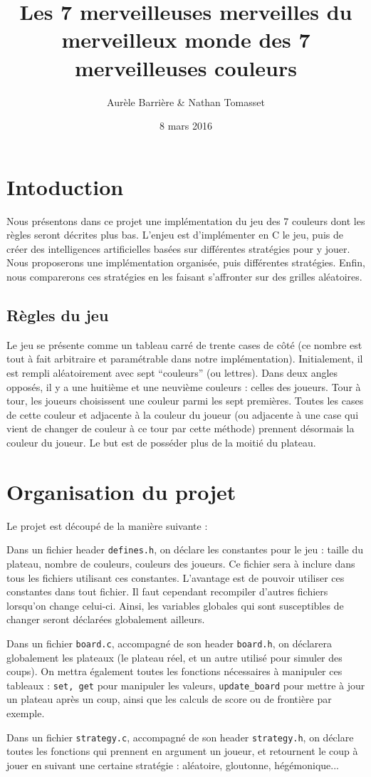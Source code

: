 \documentclass[12pt]{article}
\title{Les 7 merveilleuses merveilles du merveilleux monde des 7 merveilleuses couleurs}
\author{Aurèle Barrière \& Nathan Tomasset}
\date{8 mars 2016}
\def\question#1{\subsection*{#1}}
\def\sec#1{\section{#1}}
\begin{document}
\maketitle
\tableofcontents
\newpage

\sec{Intoduction}
Nous présentons dans ce projet une implémentation du jeu des 7 couleurs dont les règles seront décrites plus bas. L'enjeu est d'implémenter en C le jeu, puis de créer des intelligences artificielles basées sur différentes stratégies pour y jouer.
Nous proposerons une implémentation organisée, puis différentes stratégies. Enfin, nous comparerons ces stratégies en les faisant s'affronter sur des grilles aléatoires.


\question{Règles du jeu}
Le jeu se présente comme un tableau carré de trente cases de côté (ce nombre est tout à fait arbitraire et paramétrable dans notre implémentation). Initialement, il est rempli aléatoirement avec sept ``couleurs'' (ou lettres). Dans deux angles opposés, il y a une huitième et une neuvième couleurs : celles des joueurs. Tour à tour, les joueurs choisissent une couleur parmi les sept premières. Toutes les cases de cette couleur et adjacente à la couleur du joueur (ou adjacente à une case qui vient de changer de couleur à ce tour par cette méthode) prennent désormais la couleur du joueur. Le but est de posséder plus de la moitié du plateau.

\sec{Organisation du projet}
Le projet est découpé de la manière suivante :

Dans un fichier header \texttt{defines.h}, on déclare les constantes pour le jeu : taille du plateau, nombre de couleurs, couleurs des joueurs. Ce fichier sera à inclure dans tous les fichiers utilisant ces constantes.
L'avantage est de pouvoir utiliser ces constantes dans tout fichier. Il faut cependant recompiler d'autres fichiers lorsqu'on change celui-ci. Ainsi, les variables globales qui sont susceptibles de changer seront déclarées globalement ailleurs.

Dans un fichier \texttt{board.c}, accompagné de son header \texttt{board.h}, on déclarera globalement les plateaux (le plateau réel, et un autre utilisé pour simuler des coups). On mettra également toutes les fonctions nécessaires à manipuler ces tableaux : \texttt{set, get} pour manipuler les valeurs, \texttt{update\_board} pour mettre à jour un plateau après un coup, ainsi que les calculs de score ou de frontière par exemple.

Dans un fichier \texttt{strategy.c}, accompagné de son header \texttt{strategy.h}, on déclare toutes les fonctions qui prennent en argument un joueur, et retournent le coup à jouer en suivant une certaine stratégie : aléatoire, gloutonne, hégémonique...
\end{document}
